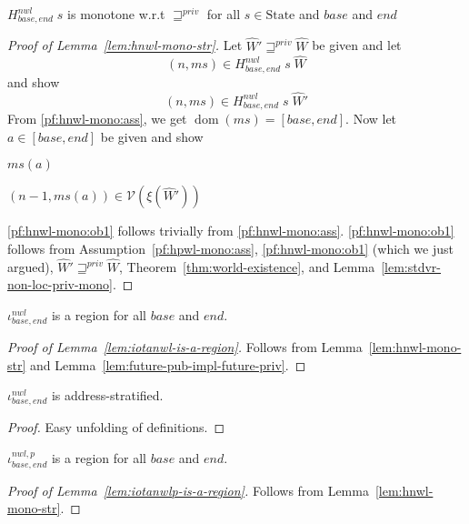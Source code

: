\documentclass[a4paper]{article}
\DeclareMathOperator{\dom}{dom}
\newcommand{\var}[1]{\mathit{#1}}
\newcommand{\hs}{\var{ms}}
\newcommand{\ms}{\hs}
\newcommand{\addr}{\var{a}}
\newcommand{\start}{\var{base}}
\newcommand{\addrend}{\var{end}}
\newcommand{\nwl}{\var{nwl}}
\newcommand{\futurestr}{\mathbin{\sqsupseteq}^{\var{priv}}}
\newcommand{\asmType}{\plaindom{AsmType}}
\newcommand{\plaindom}[1]{\mathrm{#1}}
\newcommand{\States}{\plaindom{State}}
\newcommand{\intr}[2]{\mathcal{#1}}
\newcommand{\valueintr}[1]{\intr{V}{#1}}
\newcommand{\stdvr}{\valueintr{\asmType}}
\newcommand{\npair}[2][n]{\left(#1,#2 \right)}
\newcommand{\nonlocal}[1]{\ensuremath{#1} \text{ is non-local}}
\begin{document}
\begin{lemma}
  \label{lem:hnwl-mono-str}
  $H^\nwl_{\start,\addrend} \; s$ is monotone w.r.t $\futurestr$ for all $s \in \States$ and $\start$ and $\addrend$
\end{lemma}
\begin{proof}[Proof of Lemma~\ref{lem:hnwl-mono-str}]
  Let $\hat{W}' \futurestr \hat{W}$ be given and let 
  \begin{equation}
    \label{pf:hnwl-mono:ass}
    \npair{\ms} \in H^\nwl_{\start,\addrend}\; s \; \hat{W}
  \end{equation}
  and show
  \[
    \npair{\ms} \in H^\nwl_{\start,\addrend}\; s \; \hat{W}'
  \]
  From \ref{pf:hnwl-mono:ass}, we get $\dom(\ms) = [\start,\addrend]$. Now let $\addr \in [\start,\addrend]$ be given and show
  \begin{enumproof}
    \item \nonlocal{\ms(a)} \label{pf:hnwl-mono:ob1}
    \item $\npair[n-1]{\ms(a)} \in \stdvr(\xi(\hat{W}'))$ \label{pf:hnwl-mono:ob2}
  \end{enumproof}
  \ref{pf:hnwl-mono:ob1} follows trivially from \ref{pf:hnwl-mono:ass}. \ref{pf:hnwl-mono:ob1} follows from Assumption~\ref{pf:hpwl-mono:ass}, \ref{pf:hnwl-mono:ob1} (which we just argued), $\hat{W}' \futurestr \hat{W}$, Theorem~\ref{thm:world-existence}, and Lemma~\ref{lem:stdvr-non-loc-priv-mono}.
\end{proof}


\begin{lemma}
  \label{lem:iotanwl-is-a-region}
  $\iota^\nwl_{\start,\addrend}$ is a region for all $\start$ and $\addrend$.
\end{lemma}
\begin{proof}[Proof of Lemma~\ref{lem:iotanwl-is-a-region}]
  Follows from Lemma~\ref{lem:hnwl-mono-str} and Lemma~\ref{lem:future-pub-impl-future-priv}.
\end{proof}


\begin{lemma}
  \label{lem:iota-nwl-address-stratified}
  $\iota^\nwl_{\start,\addrend}$ is address-stratified.
\end{lemma}
\begin{proof}
  Easy unfolding of definitions.
\end{proof}

\begin{lemma}
  \label{lem:iotanwlp-is-a-region}
  $\iota^{\nwl,p}_{\start,\addrend}$ is a region for all $\start$ and $\addrend$.
\end{lemma}
\begin{proof}[Proof of Lemma~\ref{lem:iotanwlp-is-a-region}]
  Follows from Lemma~\ref{lem:hnwl-mono-str}.
\end{proof}
\end{document}
